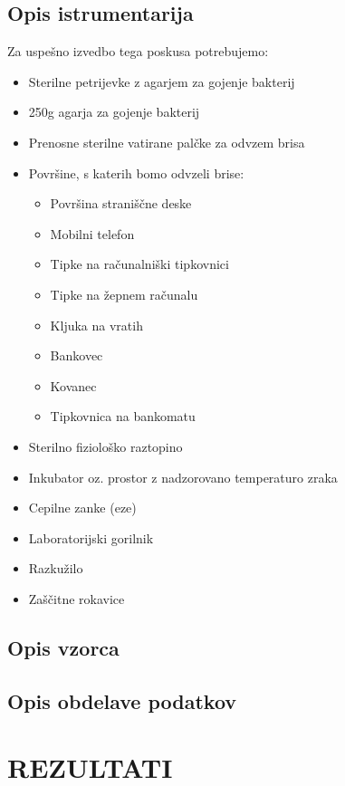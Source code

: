 \documentclass[12pt, a4paper, oneside]{report}
\begin{document}
\subsection{Opis istrumentarija}

Za uspešno izvedbo tega poskusa potrebujemo:
\begin{itemize}
  \item Sterilne petrijevke z agarjem za gojenje bakterij
  \item 250g agarja za gojenje bakterij
  \item Prenosne sterilne vatirane palčke za odvzem brisa
  \item Površine, s katerih bomo odvzeli brise:
  \begin{itemize}
    \item Površina straniščne deske
    \item Mobilni telefon
    \item Tipke na računalniški tipkovnici
    \item Tipke na žepnem računalu
    \item Kljuka na vratih
    \item Bankovec
    \item Kovanec
    \item Tipkovnica na bankomatu
  \end{itemize}
  \item Sterilno fiziološko raztopino
  \item Inkubator oz. prostor z nadzorovano temperaturo zraka
  \item Cepilne zanke (eze)
  \item Laboratorijski gorilnik
  \item Razkužilo
  \item Zaščitne rokavice

\end{itemize}

\subsection{Opis vzorca}

\subsection{Opis obdelave podatkov}

\section{REZULTATI}
\end{document}
